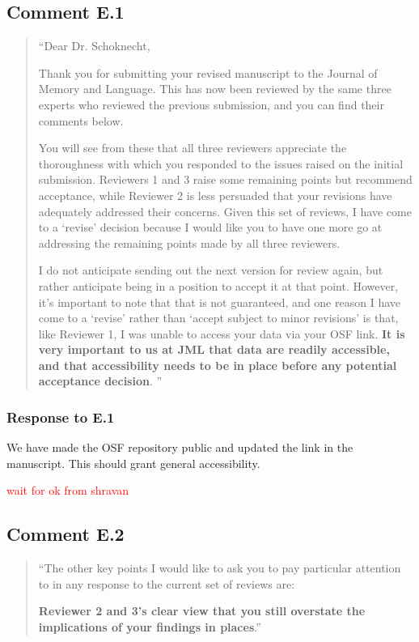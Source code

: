 \documentclass[12pt]{article}
\begin{document}
\subsection*{Comment E.1}
\begin{quote}
``Dear Dr. Schoknecht,

Thank you for submitting your revised manuscript to the Journal of Memory and Language. This has now been reviewed by the same three experts who reviewed the previous submission, and you can find their comments below.

You will see from these that all three reviewers appreciate the thoroughness with which you responded to the issues raised on the initial submission. Reviewers 1 and 3 raise some remaining points but recommend acceptance, while Reviewer 2 is less persuaded that your revisions have adequately addressed their concerns. Given this set of reviews, I have come to a `revise' decision because I would like you to have one more go at addressing the remaining points made by all three reviewers.

I do not anticipate sending out the next version for review again, but rather anticipate being in a position to accept it at that point. However, it's important to note that that is not guaranteed, and one reason I have come to a `revise' rather than `accept subject to minor revisions' is that, like Reviewer 1, I was unable to access your data via your OSF link. \textbf{It is very important to us at JML that data are readily accessible, and that accessibility needs to be in place before any potential acceptance decision}. 
''
\end{quote}

\subsubsection*{Response to E.1}
We have made the OSF repository public and updated the link in the manuscript. This should grant general accessibility.

\textcolor{red}{wait for ok from shravan} 


\subsection*{Comment E.2}
\begin{quote}
``The other key points I would like to ask you to pay particular attention to in any response to the current set of reviews are:

\textbf{Reviewer 2 and 3's clear view that you still overstate the implications of your findings in places}.''
\end{quote}
\end{document}
